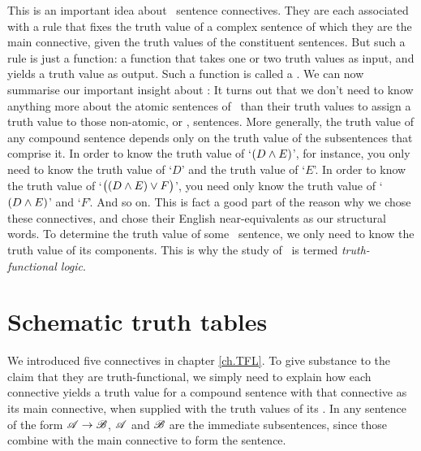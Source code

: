 This is an important idea about \TFL\ sentence connectives. They are each associated with a rule that fixes the truth value of a complex sentence of which they are the main connective, given the truth values of the constituent sentences. But such a rule is just a function: a function that takes one or two truth values as input, and yields a truth value as output. Such a function is called a . We can now summarise our important insight about \TFL: 
It turns out that we don't need to know anything more about the atomic sentences of \TFL\ than their truth values to assign a truth value to those non-atomic, or , sentences. More generally, the truth value of any compound sentence depends only on the truth value of the subsentences that comprise it. In order to know the truth value of `$(D \wedge E)$', for instance, you only need to know the truth value of `$D$' and the truth value of `$E$'. In order to know the truth value of `$\bigl( (D \wedge E) \vee F\bigr)$', you need only know the truth value of `$(D \wedge E)$' and `$F$'. And so on. This is fact a good part of the reason why we chose these connectives, and chose their English near-equivalents as our structural words. To determine the truth value of some \TFL\ sentence, we only need to know the truth value of its components. This is why the study of \TFL\ is termed \emph{truth-functional logic}.

\section{Schematic truth tables}\label{s:SchematicTruthTables}

We introduced five connectives in chapter \ref{ch.TFL}. To give substance to the claim that they are truth-functional, we simply need to explain how each connective yields a truth value for a compound sentence with that connective as its main connective, when supplied with the truth values of its . In any sentence of the form $\mathscr{A} \rightarrow \mathscr{B}$, $\mathscr{A}$ and $\mathscr{B}$ are the immediate subsentences, since those combine with the main connective to form the sentence.

